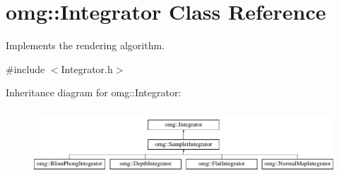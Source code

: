 \hypertarget{classomg_1_1_integrator}{}\section{omg\+::Integrator Class Reference}
\label{classomg_1_1_integrator}


Implements the rendering algorithm.  




{\ttfamily \#include $<$Integrator.\+h$>$}

Inheritance diagram for omg\+::Integrator\+:\begin{figure}[H]
\begin{center}
\leavevmode
\includegraphics[height=2.500000cm]{classomg_1_1_integrator}
\end{center}
\end{figure}
